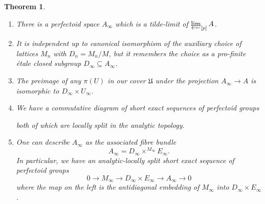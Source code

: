 \documentclass[10pt,oneside]{amsart}
\newtheorem{theorem}{Theorem}[section]
\theoremstyle{definition}
\begin{document}
	\begin{theorem}\label{tilde-limit of tilde-limits of partial towers is tilde-limit of whole tower}
		\begin{enumerate}
		\item There is a perfectoid space  $A_\infty$ which is a tilde-limit of $\varprojlim_{[p]}A$.
		\item It is independent up to canonical isomorphism of the auxiliary choice of lattices $M_n$ with $D_n=M_n/M$, but it remembers the choice as a pro-finite \'etale closed subgroup $D_\infty \subseteq A_\infty$. 
		\item The preimage of any $\pi(U)$ in our cover $\mathfrak U$ under the projection $A_\infty \rightarrow A$ is isomorphic to $D_\infty \times U_\infty$. 
		
		\item 	We have a commutative diagram of short exact sequences of perfectoid groups		
		\begin{center}
		\end{center}
		both of which are locally split in the analytic topology.
		\item One can describe $A_\infty$ as the associated fibre bundle
		\[A_\infty = D_\infty\times^{M_\infty}E_\infty.\]
		In particular, we have an analytic-locally split short exact sequence of perfectoid groups
		\[0\rightarrow M_\infty\rightarrow D_\infty \times E_\infty \rightarrow A_\infty\rightarrow 0\]
		where the map on the left is the antidiagonal embedding of $M_\infty$ into $D_\infty\times E_\infty$.
		\end{enumerate}
	\end{theorem}
\end{document}
